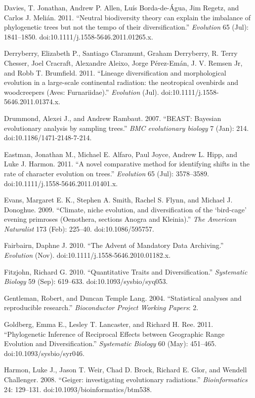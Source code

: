 \documentclass[author-year, 8pt, 3p]{elsarticle} %
\begin{document}
Davies, T. Jonathan, Andrew P. Allen, Luís Borda-de-Água, Jim Regetz,
and Carlos J. Melián. 2011. ``Neutral biodiversity theory can explain
the imbalance of phylogenetic trees but not the tempo of their
diversification.'' \emph{Evolution} 65 (Jul): 1841--1850.
doi:10.1111/j.1558-5646.2011.01265.x.

Derryberry, Elizabeth P., Santiago Claramunt, Graham Derryberry, R.
Terry Chesser, Joel Cracraft, Alexandre Aleixo, Jorge Pérez-Emán, J. V.
Remsen Jr, and Robb T. Brumfield. 2011. ``Lineage diversification and
morphological evolution in a large-scale continental radiation: the
neotropical ovenbirds and woodcreepers (Aves: Furnariidae).''
\emph{Evolution} (Jul). doi:10.1111/j.1558-5646.2011.01374.x.

Drummond, Alexei J., and Andrew Rambaut. 2007. ``BEAST: Bayesian
evolutionary analysis by sampling trees.'' \emph{BMC evolutionary
biology} 7 (Jan): 214. doi:10.1186/1471-2148-7-214.

Eastman, Jonathan M., Michael E. Alfaro, Paul Joyce, Andrew L. Hipp, and
Luke J. Harmon. 2011. ``A novel comparative method for identifying
shifts in the rate of character evolution on trees.'' \emph{Evolution}
65 (Jul): 3578--3589. doi:10.1111/j.1558-5646.2011.01401.x.

Evans, Margaret E. K., Stephen A. Smith, Rachel S. Flynn, and Michael J.
Donoghue. 2009. ``Climate, niche evolution, and diversification of the
`bird-cage' evening primroses (Oenothera, sections Anogra and
Kleinia).'' \emph{The American Naturalist} 173 (Feb): 225--40.
doi:10.1086/595757.

Fairbairn, Daphne J. 2010. ``The Advent of Mandatory Data Archiving.''
\emph{Evolution} (Nov). doi:10.1111/j.1558-5646.2010.01182.x.

Fitzjohn, Richard G. 2010. ``Quantitative Traits and Diversification.''
\emph{Systematic Biology} 59 (Sep): 619--633. doi:10.1093/sysbio/syq053.

Gentleman, Robert, and Duncan Temple Lang. 2004. ``Statistical analyses
and reproducible research.'' \emph{Bioconductor Project Working Papers}:
2.

Goldberg, Emma E., Lesley T. Lancaster, and Richard H. Ree. 2011.
``Phylogenetic Inference of Reciprocal Effects between Geographic Range
Evolution and Diversification.'' \emph{Systematic Biology} 60 (May):
451--465. doi:10.1093/sysbio/syr046.

Harmon, Luke J., Jason T. Weir, Chad D. Brock, Richard E. Glor, and
Wendell Challenger. 2008. ``Geiger: investigating evolutionary
radiations.'' \emph{Bioinformatics} 24: 129--131.
doi:10.1093/bioinformatics/btm538.
\end{document}
